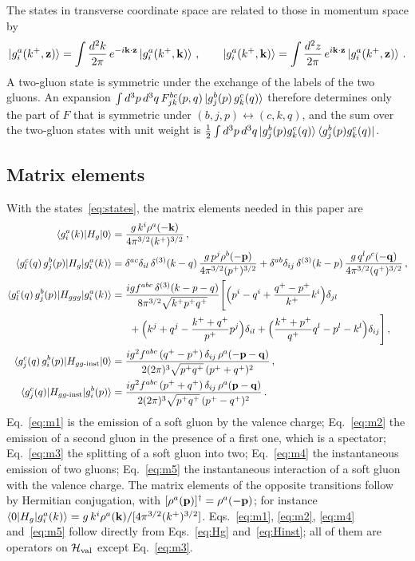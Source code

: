 The states in transverse coordinate space are related to those in momentum space by
\begin{align}\label{eq:stateFT}
\ket{g^a_i(k^+,\mathbf{z})}=\int\frac{d^2k}{2\pi}\,e^{-i\mathbf{k}\cdot\mathbf{z}}\ket{g^a_i(k^+,\mathbf{k})}\,,\qquad
\ket{g^a_i(k^+,\mathbf{k})}=\int\frac{d^2z}{2\pi}\,e^{i\mathbf{k}\cdot\mathbf{z}}\ket{g^a_i(k^+,\mathbf{z})}\,.
\end{align}
A two-gluon state is symmetric under the exchange of the labels of the two gluons. An expansion $\int d^3p\,d^3q\,F^{bc}_{jk}(p,q)\ket{g^b_j(p)\,g^c_k(q)}$ therefore determines only the part of $F$ that is symmetric under $(b,j,p)\leftrightarrow(c,k,q)$, and the sum over the two-gluon states with unit weight is $\frac12\int d^3p\,d^3q\ket{g^b_j(p)g^c_k(q)}\bra{g^b_j(p)g^c_k(q)}$.


\subsection{Matrix elements}\label{app:matrixelements}

With the states~\eqref{eq:states}, the matrix elements needed in this paper are
\begin{align}
\braket{g^a_i(k)|H_g|0}&=\frac{g\,k^i\rho^a(-\mathbf{k})}{4\pi^{3/2}(k^+)^{3/2}}\,,\label{eq:m1}\\
\braket{g^c_l(q)\,g^b_j(p)|H_g|g^a_i(k)}&=\delta^{ac}\delta_{il}\,\delta^{(3)}(k-q)\,\frac{g\,p^j\rho^b(-\mathbf{p})}{4\pi^{3/2}(p^+)^{3/2}}
+\delta^{ab}\delta_{ij}\,\delta^{(3)}(k-p)\,\frac{g\,q^l\rho^c(-\mathbf{q})}{4\pi^{3/2}(q^+)^{3/2}}\,,\label{eq:m2}\\
\braket{g^c_l(q)\,g^b_j(p)|H_{ggg}|g^a_i(k)}&=\frac{igf^{abc}\,\delta^{(3)}(k-p-q)}{8\pi^{3/2}\sqrt{k^+p^+q^+}}\Bigg[\Big(p^i-q^i+\frac{q^+-p^+}{k^+}k^i\Big)\delta_{jl}\notag\\
&\hspace{0.6cm}+\Big(k^j+q^j-\frac{k^++q^+}{p^+}p^j\Big)\delta_{il}
+\Big(\frac{k^++p^+}{q^+}q^l-p^l-k^l\Big)\delta_{ij}\Bigg]\,,\label{eq:m3}\\
\braket{g^c_j(q)\,g^b_i(p)|H_{gg\text{-inst}}|0}&
=\frac{ig^2f^{abc}\,(q^+-p^+)\,\delta_{ij}\,\rho^a(-\mathbf{p}-\mathbf{q})}{2(2\pi)^3\sqrt{p^+q^+}\,(p^++q^+)^2}\,,\label{eq:m4}\\
\braket{g^c_j(q)|H_{gg\text{-inst}}|g^b_i(p)}&
=\frac{ig^2f^{abc}\,(p^++q^+)\,\delta_{ij}\,\rho^a(\mathbf{p}-\mathbf{q})}{2(2\pi)^3\sqrt{p^+q^+}\,(p^+-q^+)^2}\,.\label{eq:m5}
\end{align}
Eq.~\eqref{eq:m1} is the emission of a soft gluon by the valence charge; Eq.~\eqref{eq:m2} the emission of a second gluon in the presence of a first one, which is a spectator; Eq.~\eqref{eq:m3} the splitting of a soft gluon into two; Eq.~\eqref{eq:m4} the instantaneous emission of two gluons; Eq.~\eqref{eq:m5} the instantaneous interaction of a soft gluon with the valence charge. The matrix elements of the opposite transitions follow by Hermitian conjugation, with $[\rho^a(\mathbf{p})]^\dagger=\rho^a(-\mathbf{p})$; for instance $\braket{0|H_g|g^a_i(k)}=g\,k^i\rho^a(\mathbf{k})/[4\pi^{3/2}(k^+)^{3/2}]$. Eqs.~\eqref{eq:m1}, \eqref{eq:m2}, \eqref{eq:m4} and~\eqref{eq:m5} follow directly from Eqs.~\eqref{eq:Hg} and~\eqref{eq:Hinst}; all of them are operators on $\mathcal H_{\rm val}$ except Eq.~\eqref{eq:m3}.

